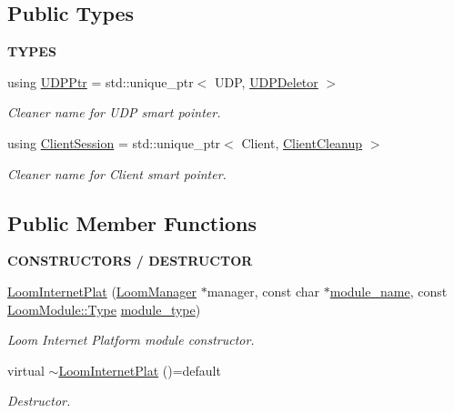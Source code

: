\subsection*{Public Types}
\begin{Indent}{\bf T\+Y\+P\+ES}\par
\begin{DoxyCompactItemize}
\item 
using \hyperlink{class_loom_internet_plat_a0b2cc742a6ac5f4f7054b75ea99b345c}{U\+D\+P\+Ptr} = std\+::unique\+\_\+ptr$<$ U\+DP, \hyperlink{struct_loom_internet_plat_1_1_u_d_p_deletor}{U\+D\+P\+Deletor} $>$
\begin{DoxyCompactList}\small\item\em Cleaner name for U\+DP smart pointer. \end{DoxyCompactList}\item 
using \hyperlink{class_loom_internet_plat_a7044d4ef42ec9181d519e6d37365789d}{Client\+Session} = std\+::unique\+\_\+ptr$<$ Client, \hyperlink{struct_loom_internet_plat_1_1_client_cleanup}{Client\+Cleanup} $>$
\begin{DoxyCompactList}\small\item\em Cleaner name for Client smart pointer. \end{DoxyCompactList}\end{DoxyCompactItemize}
\end{Indent}
\subsection*{Public Member Functions}
\begin{Indent}{\bf C\+O\+N\+S\+T\+R\+U\+C\+T\+O\+RS / D\+E\+S\+T\+R\+U\+C\+T\+OR}\par
\begin{DoxyCompactItemize}
\item 
\hyperlink{class_loom_internet_plat_a357f426519f563931cf6793bca0ae397}{Loom\+Internet\+Plat} (\hyperlink{class_loom_manager}{Loom\+Manager} $\ast$manager, const char $\ast$\hyperlink{class_loom_module_adf6e68ad7e9fa2acfca7a8a280680764}{module\+\_\+name}, const \hyperlink{class_loom_module_aee91d0a75140d51ee428fc2d4417d865}{Loom\+Module\+::\+Type} \hyperlink{class_loom_module_a152d394f37236a2b159dae19da67eeb0}{module\+\_\+type})
\begin{DoxyCompactList}\small\item\em Loom Internet Platform module constructor. \end{DoxyCompactList}\item 
virtual \hyperlink{class_loom_internet_plat_a36f9cc600e5ee1a916c330da914a3b11}{$\sim$\+Loom\+Internet\+Plat} ()=default
\begin{DoxyCompactList}\small\item\em Destructor. \end{DoxyCompactList}\end{DoxyCompactItemize}
\end{Indent}
